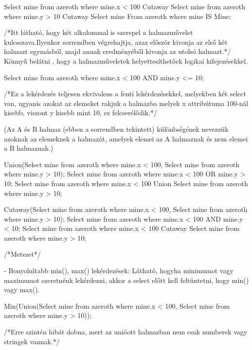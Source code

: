 \begin{sql}
\begin{sql}
Select mine from azeroth where mine.x < 100 Cutaway Select mine from azeroth where mine.y > 10 Cutaway Select mine From azeroth where mine IS Mine;
\end{sql}
/*Itt látható, hogy két alkalommal is szerepel a halmazművelet kulcsszava.Ilyenkor sorrendben végrehajtja, azaz először kivonja az első két halmazt egymásból, majd annak eredményéből kivonja az utolsó halmazt.*/
Könnyű belátni , hogy a halmazműveletek helyettesíthetőek logikai kifejezésekkel.

\begin{sql}
Select mine from azeroth where mine.x < 100 AND mine.y <= 10;
\end{sql}
/*Ez a lekérdezés teljesen ekvivalens a fenti lekérdezésekkel, melyekben két select van, ugyanis azokat az elemeket rakjuk a halmazba melyek x attribútuma 100-nál kisebb, viszont y kisebb mint 10, ez felcserélődik.*/

(Az A és B halmaz (ebben a sorrendben tekintett) különbségének nevezzük azoknak az elemeknek a halmazát, amelyek elemei az A halmaznak és nem elemei a B halmaznak.)

\begin{sql}
Union(Select mine from azeroth where mine.x < 100, Select mine from azeroth where mine.y > 10);
Select mine from azeroth where mine.x < 100 OR mine.y > 10;
Select mine from azeroth where mine.x < 100 Union Select mine from azeroth where mine.y > 10;
\end{sql}

\begin{sql}
Cutaway(Select mine from azeroth where mine.x < 100, Select mine from azeroth where mine.y > 10);
Select mine from azeroth where mine.x < 100 AND mine.y < 10;
Select mine from azeroth where mine.x < 100 Cutaway Select mine from azeroth where mine.y > 10;
\end{sql}

/*Metszet*/

- Bonyolultabb min(), max() lekérdezések: Látható, hogyha minimumot vagy maximumot szeretnénk lekérdezni, akkor a select előtt kell feltüntetni, hogy min() vagy max().

\begin{sql}
Min(Union(Select mine from azeroth where mine.x < 100, Select mine from azeroth where mine.y > 10));
\end{sql}
/*Erre szintén hibát dobna, mert az unióott halmazban nem csak numberek vagy stringek vannak.*/


\end{sql}
